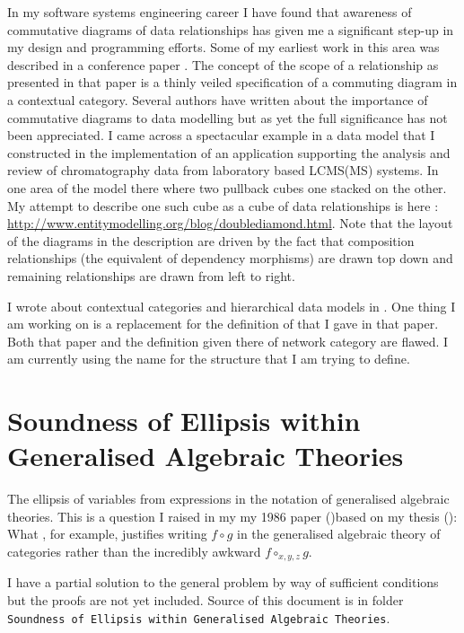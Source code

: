\documentclass[10pt,a4paper]{article}
\theoremstyle{remark}
\newcommand {\myfirstpaper}{my 1986 paper (\cite{Cartmell86})based on my thesis (\cite{Cartmell78})}
\begin{document}
\note 
In my software systems engineering  career I have found that awareness of  commutative diagrams of data relationships 
has given me a significant step-up in my design and programming efforts. 
Some of my earliest work in this area was described in a conference paper  \cite{CartmellScopePaper}. 
The concept of the scope of a relationship as presented in that paper is a thinly veiled
specification of a commuting diagram in a contextual category. 
Several authors have written about the importance of commutative diagrams to data modelling but 
as yet the full significance has not been appreciated. I came across a spectacular example in a data model that I constructed 
in the implementation of an application supporting the analysis and review of chromatography data from laboratory based LCMS(MS) systems.
In one area of the model there where two pullback cubes one stacked on the other. My attempt to describe one such cube as a cube of data relationships
is here : \url{http://www.entitymodelling.org/blog/doublediamond.html}. Note that the layout of the diagrams in the description are driven by the fact that composition relationships (the equivalent of dependency morphisms) are drawn top down and remaining relationships are drawn from left to right.

\note
I wrote about contextual categories and hierarchical data models in \cite{CartmellNetworkDataModel}.
One thing I am working on  is a replacement for the definition 
 of  that I gave in that paper. Both that paper and the definition given there of network category are flawed.
I am currently using the name  for the structure that I am trying to define.

\section{Soundness of Ellipsis within Generalised Algebraic Theories}
\note
The ellipsis of variables from expressions in the notation of generalised algebraic theories. 
This is a question I raised in my \myfirstpaper :
What , for example, justifies writing $f \circ g$ in the generalised algebraic theory of categories rather than the incredibly awkward $f \circ_{x,y,z} g$. 

I have a partial solution to the general problem by way of sufficient conditions but the proofs are not yet included. 
Source of this 
document is in folder {\small \texttt{Soundness of Ellipsis within Generalised Algebraic Theories}}.
\end{document}
